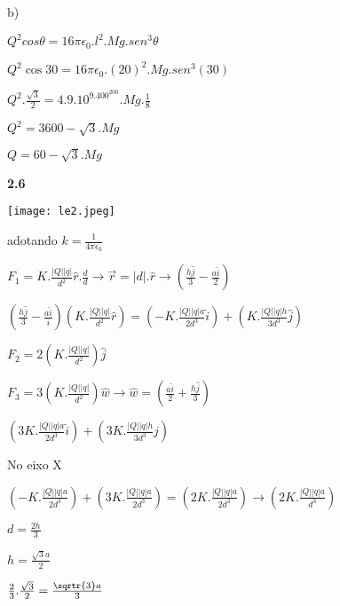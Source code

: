 \documentclass{article}
\begin{document}
b)\newline

$Q^2 cos\theta = 16\pi\epsilon_0.l^2.Mg.sen^3\theta$\newline

$Q^2 \cos30 = 16\pi\epsilon_0.(20)^2. Mg.sen^3(30)$\newline

$Q^2.\frac{\sqrt{3}}{2} = 4. 9.10^9.400^200.Mg.\frac{1}{8}$\newline

$Q^2 = 3600 - \sqrt{3}.Mg$\newline

$Q = 60 - \sqrt{3}. Mg$\newline

\textbf{2.6}

\texttt{[image: le2.jpeg]}\newline

adotando $k= \frac{1}{4\pi \epsilon _0}$\newline

$F_1=K. \frac{|Q| |q|}{d^2} \hat r . \frac{d}{d} \rightarrow
\Vec{r} =|d|.\hat r \rightarrow (\frac{h \hat j}{3}-\frac{a \hat i}{2})$\newline

$(\frac{h \hat j}{3}-\frac{a \hat i}{i})(K. \frac{|Q| |q|}{d^2} \hat r)=
(-K. \frac{|Q||q|a}{2d^3} \hat i)+(K. \frac{|Q||q|h}{3d^3} \hat j)$\newline

$F_2 = 2(K. \frac{|Q| |q|}{d^2})\hat j$\newline

$F_3 = 3(K. \frac{|Q| |q|}{d^2})\hat w \rightarrow \hat w=(\frac{a \hat i}{2}+\frac{h \hat j}{3}) $\newline

$(3K. \frac{|Q||q|a}{2d^3} \hat i)+(3K. \frac{|Q||q|h}{3d^3} \hat j)$\newline

No eixo X\newline

$(-K. \frac{|Q||q|a}{2d^3}) + (3K. \frac{|Q||q|a}{2d^3}) = (2K. \frac{|Q||q|a}{2d^3}) \rightarrow (2K. \frac{|Q||q|a}{d^3})$\newline

$d= \frac{2h}{3}$\newline

$h=\frac{\sqrt{3}a}{2}$\newline

$\frac{2}{3}.\frac{\sqrt{3}}{2}=\frac{\sqrtr{3}a}{3}$\newline
\end{document}
